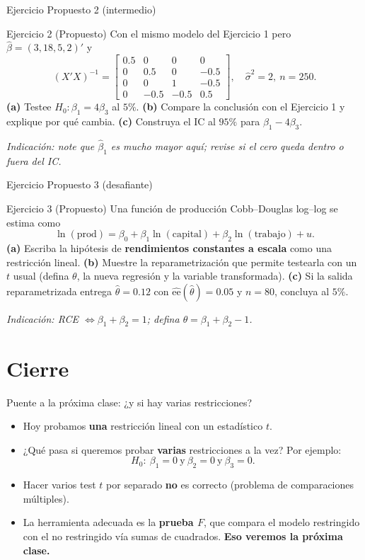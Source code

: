 \documentclass{beamer}
\begin{document}
\begin{frame}{Ejercicio Propuesto 2 (intermedio)}
\begin{block}{Ejercicio 2 (Propuesto)}
Con el mismo modelo del Ejercicio 1 pero $\hat{\beta}=(3,18,5,2)'$ y
\[
(X'X)^{-1}=\begin{bmatrix}0.5&0&0&0\\0&0.5&0&-0.5\\0&0&1&-0.5\\0&-0.5&-0.5&0.5\end{bmatrix},\quad \hat{\sigma}^2=2,\ n=250.
\]
\textbf{(a)} Testee $H_0:\beta_1=4\beta_3$ al $5\%$. \textbf{(b)} Compare la conclusión con el Ejercicio 1 y explique por qué cambia. \textbf{(c)} Construya el IC al $95\%$ para $\beta_1-4\beta_3$.
\end{block}
{\small \textit{Indicación: note que $\hat{\beta}_1$ es mucho mayor aquí; revise si el cero queda dentro o fuera del IC.}}
\end{frame}

\begin{frame}{Ejercicio Propuesto 3 (desafiante)}
\begin{block}{Ejercicio 3 (Propuesto)}
Una función de producción Cobb--Douglas log--log se estima como
\[
\ln(\text{prod})=\beta_0+\beta_1\ln(\text{capital})+\beta_2\ln(\text{trabajo})+u.
\]
\textbf{(a)} Escriba la hipótesis de \textbf{rendimientos constantes a escala} como una restricción lineal. \textbf{(b)} Muestre la reparametrización que permite testearla con un $t$ usual (defina $\theta$, la nueva regresión y la variable transformada). \textbf{(c)} Si la salida reparametrizada entrega $\hat{\theta}=0{.}12$ con $\widehat{\text{ee}}(\hat{\theta})=0{.}05$ y $n=80$, concluya al $5\%$.
\end{block}
{\small \textit{Indicación: RCE $\Leftrightarrow \beta_1+\beta_2=1$; defina $\theta=\beta_1+\beta_2-1$.}}
\end{frame}

\section{Cierre}

\begin{frame}{Puente a la próxima clase: ¿y si hay varias restricciones?}
\begin{itemize}
    \item Hoy probamos \textbf{una} restricción lineal con un estadístico $t$.
    \item ¿Qué pasa si queremos probar \textbf{varias} restricciones a la vez? Por ejemplo:
    \[
    H_0:\ \beta_1=0\ \text{y}\ \beta_2=0\ \text{y}\ \beta_3=0.
    \]
    \item Hacer varios test $t$ por separado \textbf{no} es correcto (problema de comparaciones múltiples).
    \item La herramienta adecuada es la \textbf{prueba $F$}, que compara el modelo restringido con el no restringido vía sumas de cuadrados. \textbf{Eso veremos la próxima clase.}
\end{itemize}
\end{frame}
\end{document}
